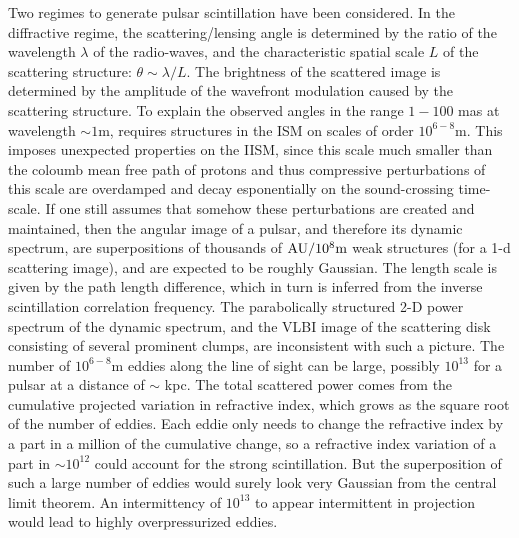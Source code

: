 \documentclass[useAMS,usenatbib]{mn2e}
\begin{document}
Two regimes to generate pulsar scintillation have been considered. In
the diffractive regime, the scattering/lensing angle is determined by
the ratio of the wavelength
$\lambda$ of the radio-waves, and the characteristic spatial scale $L$ of the scattering structure: $\theta\sim\lambda/L$.   The brightness of the scattered
image  is determined by the amplitude of the wavefront modulation caused by the scattering structure.  To explain
the observed angles in the range $1-100$ mas at wavelength $\sim 1$m,
requires structures in the ISM on scales of order $10^{6-8}$m. This
imposes unexpected properties on the IISM, since this scale
much smaller than the coloumb mean free path of protons and thus compressive perturbations of
this scale are overdamped and decay esponentially on the sound-crossing time-scale.  If one still assumes that somehow these perturbations are created and maintained,
then the angular image of a
pulsar, and therefore its dynamic spectrum, are superpositions of
thousands of 
$\hbox{AU}/10^8\hbox{m}$ weak structures (for a 1-d scattering image),
and are expected to be roughly Gaussian.  The length scale is given by
the path length difference, which in turn is inferred from the
inverse scintillation correlation frequency.
The
parabolically structured 2-D power spectrum of the dynamic spectrum,
and the VLBI image of the scattering disk consisting of several prominent clumps, are inconsistent with such
a picture.  The number of $10^{6-8}$m eddies along the line of sight
can be large, possibly $10^{13}$ for a pulsar at a distance of $\sim$
kpc.  The total scattered power comes from the cumulative projected
variation in refractive index, which grows as the square root of the
number of eddies.  Each eddie only needs to change the refractive
index by a part in a million of the cumulative change, so a refractive
index variation of a part in $\sim 10^{12}$ could account for the
strong scintillation.   But the superposition of such a large number
of eddies would surely look very Gaussian from the central limit
theorem.  An intermittency of $10^{13}$ to appear intermittent in
projection would lead to highly overpressurized eddies.
\end{document}
